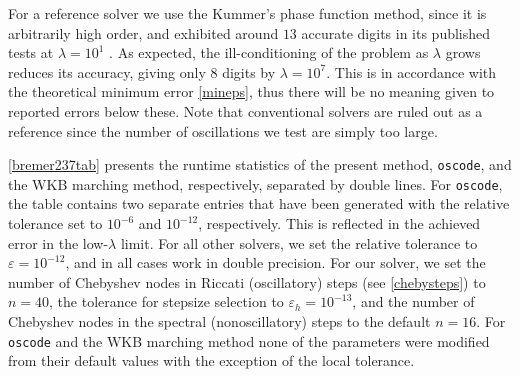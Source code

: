 \documentclass[10pt]{article}
\newcommand{\veps}{\varepsilon}
\begin{document}
For a reference solver we 
use the Kummer's phase function method, since it is arbitrarily high
order, and exhibited around $13$ accurate digits
in its published tests at $\lambda = 10^1$ \cite[Table~1]{bremer2018}.
As expected,
the ill-conditioning of the problem as $\lambda$
grows
reduces its accuracy, giving only $8$ digits by $\lambda = 10^7$.
This is in accordance with the theoretical minimum error \eqref{mineps},
thus there will be no meaning given to reported errors below these.
Note that conventional solvers are ruled out as a reference since
the number of oscillations we test are simply too large.

\cref{bremer237tab} presents the runtime statistics of the present method,
\texttt{oscode}, and the WKB marching method, respectively, separated by double
lines. For \texttt{oscode}, the table contains two separate entries that have
been generated with the relative tolerance set to $10^{-6}$ and $10^{-12}$,
respectively. This is reflected in the achieved error in the low-$\lambda$
limit. For all other solvers, we set the relative tolerance to $\veps=10^{-12}$, and
in all cases work in double precision. For our solver, we set the number of
Chebyshev nodes in Riccati (oscillatory) steps (see \cref{chebysteps}) to $n = 40$, the
tolerance for stepsize selection to $\varepsilon_h = 10^{-13}$, and the number
of Chebyshev nodes in the spectral (nonoscillatory) steps to the default
$n = 16$. For \texttt{oscode} and the WKB
marching method none of the parameters were modified from their default values
with the exception of the local tolerance.
\end{document}
